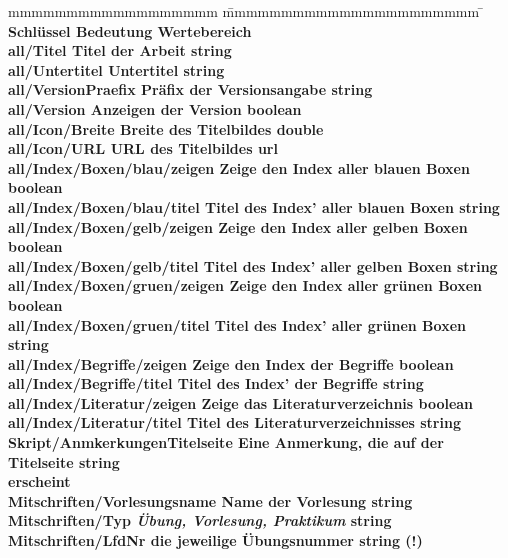 			\begin{tabbing}
				mmmmmmmmmmmmmmmmmm				\= mmmmmmmmmmmmmmmmmmmmmm 				\=\kill
				\bf Schlüssel					\> \bf Bedeutung 						\> \bf Wertebereich	\\
				all/Titel	 					\> Titel der Arbeit						\> string			\\
				all/Untertitel 					\> Untertitel							\> string			\\
				all/VersionPraefix 				\> Präfix der Versionsangabe			\> string			\\
				all/Version 					\> Anzeigen der Version					\> boolean 			\\
				all/Icon/Breite					\> Breite des Titelbildes				\> double 			\\
				all/Icon/URL					\> URL des Titelbildes					\> url				\\
				all/Index/Boxen/blau/zeigen 	\> Zeige den Index aller blauen Boxen	\> boolean 			\\
				all/Index/Boxen/blau/titel 		\> Titel des Index' aller blauen Boxen	\> string			\\
				all/Index/Boxen/gelb/zeigen 	\> Zeige den Index aller gelben Boxen	\> boolean 			\\
				all/Index/Boxen/gelb/titel 		\> Titel des Index' aller gelben Boxen	\> string			\\
				all/Index/Boxen/gruen/zeigen 	\> Zeige den Index aller grünen Boxen	\> boolean 			\\
				all/Index/Boxen/gruen/titel 	\> Titel des Index' aller grünen Boxen	\> string			\\
				all/Index/Begriffe/zeigen 		\> Zeige den Index der Begriffe			\> boolean			\\
				all/Index/Begriffe/titel 		\> Titel des Index' der Begriffe		\> string			\\
				all/Index/Literatur/zeigen		\> Zeige das Literaturverzeichnis		\> boolean			\\
				all/Index/Literatur/titel		\> Titel des Literaturverzeichnisses	\> string			\\
				Skript/AnmkerkungenTitelseite 	\> Eine Anmerkung, die auf der Titelseite\> string			\\ 
												\> erscheint												\\
				Mitschriften/Vorlesungsname 	\> Name der Vorlesung 					\> string			\\
				Mitschriften/Typ 				\> \zb \emph{Übung, Vorlesung, Praktikum}	
																						\> string			\\
				Mitschriften/LfdNr 				\> \zb die jeweilige Übungsnummer		\> string (!)		\\

\end{tabbing}
